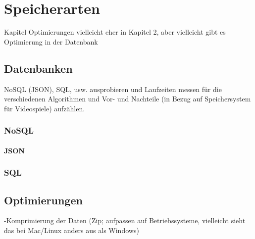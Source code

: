 \chapter{Speicherarten}\label{ch:speicherarten}

Kapitel Optimierungen vielleicht eher in Kapitel 2, aber vielleicht gibt es 
Optimierung in der Datenbank

\section{Datenbanken}
NoSQL (JSON), SQL, usw. ausprobieren und Laufzeiten messen für die verschiedenen Algorithmen 
und Vor- und Nachteile (in Bezug auf Speichersystem für Videospiele) aufzählen. 

\subsection{NoSQL}
\subsubsection{JSON}

\subsection{SQL}

\section{Optimierungen}
-Komprimierung der Daten (Zip; aufpassen auf Betriebssysteme, vielleicht sieht das bei Mac/Linux anders aus als Windows)
